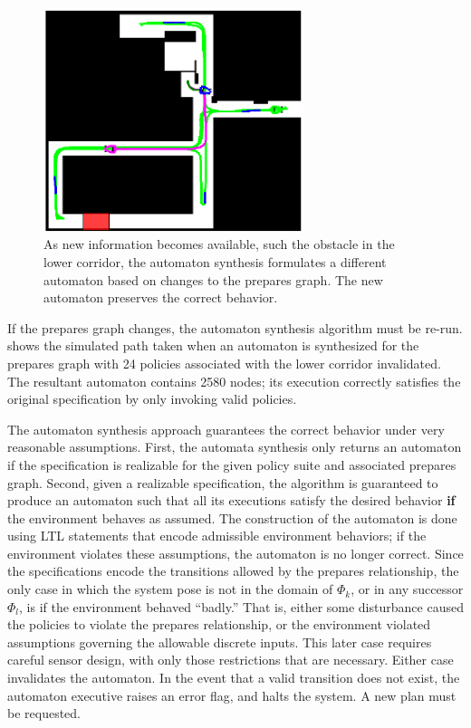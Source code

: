 \begin{figure}[bt]
  \centering 
   \includegraphics[width=3in]{graphics/AutRnd5_Sim7_path.eps}

   \caption[`LAGR' timid night watch re-planning.]{As new information
     becomes available, such the obstacle in the lower corridor, the
     automaton synthesis formulates a different automaton based on
     changes to the prepares graph.  The new automaton preserves the
     correct behavior.}
   \label{fig:lagr_Aautomaton_blocked}
\end{figure}


If the prepares graph changes, the automaton synthesis algorithm must be re-run.
 shows the simulated path taken when an automaton is
synthesized for the prepares graph with 24 policies associated with the lower
corridor invalidated.  The resultant automaton contains 2580 nodes; its execution
correctly satisfies the original specification by only invoking valid policies.


The automaton synthesis approach guarantees the correct behavior under very
reasonable assumptions.  First, the automata synthesis only returns an automaton if
the specification is realizable for the given policy suite and associated prepares
graph. Second, given a realizable specification, the algorithm is guaranteed to
produce an automaton such that all its executions satisfy the desired behavior {\bf
  if} the environment behaves as assumed.  The construction of the automaton is done
using LTL statements that encode admissible environment behaviors; if the environment
violates these assumptions, the automaton is no longer correct.  Since the
specifications encode the transitions allowed by the prepares relationship, the only
case in which the system pose is not in the domain of $\Phi_{k}$, or in any successor
$\Phi_{l}$, is if the environment behaved ``badly.''  That is, either some
disturbance caused the policies to violate the prepares relationship, or the
environment violated assumptions governing the allowable discrete inputs.  This later
case requires careful sensor design, with only those restrictions that are
necessary.  Either case invalidates the automaton.  In the event that a valid
transition does not exist, the automaton executive raises an error flag, and halts
the system.  A new plan must be requested.

